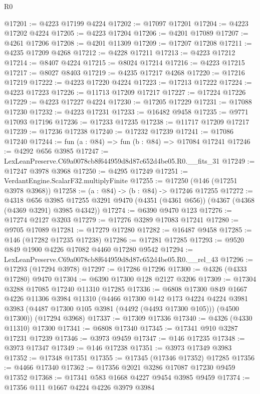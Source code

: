 \begin{lexlean}{R0}
\begin{coremodule}
@17201 := @4223 @17199 @4224
@17202 := @17097 @17201
@17204 := @4223 @17202 @4224
@17205 := @4223 @17204
@17206 := @4201 @17089
@17207 := @4261 @17206
@17208 := @4201 @11309
@17209 := @17207 @17208
@17211 := @4235 @17209 @4268
@17212 := @4228 @17211
@17213 := @4223 @17212
@17214 := @8407 @4224
@17215 := @8024 @17214
@17216 := @4223 @17215
@17217 := @8027 @8403
@17219 := @4235 @17217 @4268
@17220 := @17216 @17219
@17222 := @4223 @17220 @4224
@17223 := @17213 @17222
@17224 := @4223 @17223
@17226 := @11713 @17209 @17217
@17227 := @17224 @17226
@17229 := @4223 @17227 @4224
@17230 := @17205 @17229
@17231 := @17088 @17230
@17232 := @4223 @17231
@17233 := @16482 @9458
@17235 := @9771 @17093 @17196
@17236 := @17233 @17235
@17238 := @11717 @17209 @17217
@17239 := @17236 @17238
@17240 := @17232 @17239
@17241 := @17086 @17240
@17244 := fun (a : @84) => fun (b : @84) => @17084 @17241
@17246 := @4292 @656 @3985
@17247 := LexLeanPreserve.C69a0078cb8f644959d8d87c652d4be05.R0.__fits_31
@17249 := @17247 @3978 @3968
@17250 := @4295 @17249
@17251 := VerdantEngine.ScalarF32.multiplyFinite
@17255 := @17250 (@146 (@17251 @3978 @3968))
@17258 := (a : @84) -> (b : @84) -> @17246 @17255
@17272 := @4318
    @656
    @3985
    @17255
    @3291
    @9470
    (@4351 (@4361 @656))
    (@4367 (@4368 (@4369 @3291) @3985 @4342))
@17274 := @6390 @9470 @123
@17276 := @17274 @2127 @3203
@17279 := @17276 @3289 @17083 @17241
@17280 := @9705 @17089
@17281 := @17279 @17280
@17282 := @16487 @9458
@17285 := @146 (@17282 @17235 @17238)
@17286 := @17281 @17285
@17293 := @9520 @849 @1900 @4226 @17082 @4460 @17280 @9542
@17294 := LexLeanPreserve.C69a0078cb8f644959d8d87c652d4be05.R0.__rel_43
@17296 := @17293 (@17294 @3978)
@17297 := @17286 @17296
@17300 := @4326 (@4333 @17280) @9470
@17304 := @6390 @17300 @128 @2127 @3206
@17309 := @17304 @3288 @17085 @17240 @11310 @17285
@17336 := @6808
    @17300
    @849
    @1667
    @4226
    @11306
    @3984
    @11310
    (@4466
      @17300
      @142
      @173
      @4224
      @4224
      @3981
      @3983
      (@4487 @17300 @105 @3981 (@4492 (@4493 @17300 @105)))
      (@4500 @17300))
    (@17294 @3968)
@17337 := @17309 @17336
@17340 := @4326 (@4330 @11310) @17300
@17341 := @6808 @17340
@17345 := @17341 @910 @3287 @17231 @17239
@17346 := @3973 @9459
@17347 := @146 @17235
@17348 := @3973 @17347
@17349 := @146 @17238
@17351 := @3973 @17349 @3983
@17352 := @17348 @17351
@17355 := @17345 (@17346 @17352) @17285
@17356 := @4466 @17340
@17362 := @17356 @2021 @3286 @17087 @17230 @9459 @17352
@17368 := @17341 @583 @1668 @4227 @9454 @3985 @9459
@17374 := @17356 @111 @1667 @4224 @4226 @3979 @3984

\end{coremodule}
\end{lexlean}
